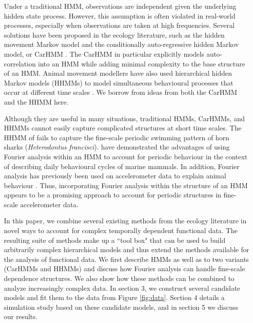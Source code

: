 Under a traditional HMM, observations are independent given the underlying hidden state process. However, this assumption is often violated in real-world processes, especially when observations are taken at high frequencies. Several solutions have been proposed in the ecology literature, such as the hidden movement Markov model \citep{Whoriskey:2016} and the conditionally auto-regressive hidden Markov model, or CarHMM \citep{Lawler:2019}. The CarHMM in particular explicitly models auto-correlation into an HMM while adding minimal complexity to the base structure of an HMM. Animal movement modellers have also used hierarchical hidden Markov models (HHMMs) to model simultaneous behavioural processes that occur at different time scales \citep{Barajas:2017,Adam:2019}. We borrow from ideas from both the CarHMM and the HHMM here.

Although they are useful in many situations, traditional HMMs, CarHMMs, and HHMMs cannot easily capture complicated structures at short time scales. The HHMM of \citet{Adam:2019} fails to capture the fine-scale periodic swimming pattern of horn sharks (\textit{Heterodontus francisci}). \citet{Heerah:2017} have demonstrated the advantages of using Fourier analysis within an HMM to account for periodic behaviour in the context of describing daily behavioural cycles of marine mammals. In addition, Fourier analysis has previously been used on accelerometer data to explain animal behaviour \citep{Fehlmann:2017,Shorter:2017}. Thus, incorporating Fourier analysis within the structure of an HMM appears to be a promising approach to account for periodic structures in fine-scale accelerometer data.

In this paper, we combine several existing methods from the ecology literature in novel ways to account for complex temporally dependent functional data. The resulting suite of methods make up a ``tool box" that can be used to build arbitrarily complex hierarchical models and thus extend the methods available for the analysis of functional data.
We first describe HMMs as well as to two variants (CarHMMs and HHMMs) and discuss how Fourier analysis can handle fine-scale dependence structures. We also show how these methods can be combined to analyze increasingly complex data. In section 3, we construct several candidate models and fit them to the data from Figure \ref{fig:data}. Section 4 details a simulation study based on these candidate models, and in section 5 we discuss our results.